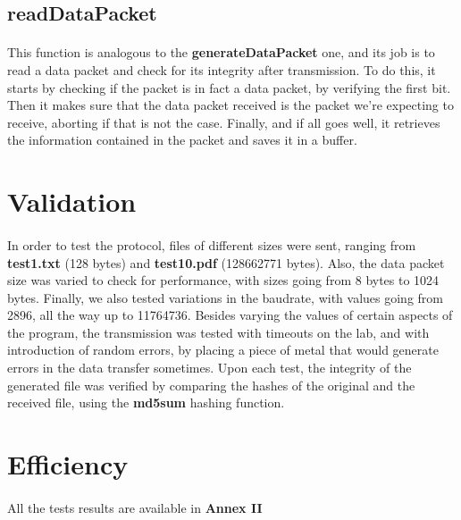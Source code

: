 \documentclass[11pt]{article}
\begin{document}
\subsection*{readDataPacket}

\paragraph{}This function is analogous to the \textbf{generateDataPacket} one, and its job is to read a data packet and check for its integrity after transmission. To do this, it starts by checking if the packet is in fact a data packet, by verifying the first bit. Then it makes sure that the data packet received is the packet we're expecting to receive, aborting if that is not the case. Finally, and if all goes well, it retrieves the information contained in the packet and saves it in a buffer.

\section{Validation}

\paragraph{}In order to test the protocol, files of different sizes were sent, ranging from
\textbf{test1.txt} (128 bytes) and \textbf{test10.pdf} (128662771 bytes). Also, the data packet size was
varied to check for performance, with sizes going from 8 bytes to 1024 bytes. Finally, we also tested
variations in the baudrate, with values going from 2896, all the way up to 11764736. Besides varying the
values of certain aspects of the program, the transmission was tested with timeouts on the lab, and with
introduction of random errors, by placing a piece of metal that would generate errors in the data transfer sometimes. Upon each test, the integrity of the generated file was verified by comparing the hashes of the original and the received file, using the \textbf{md5sum} hashing function.

\section{Efficiency}

\paragraph{}All the tests results are available in \textbf{Annex II}
\end{document}
